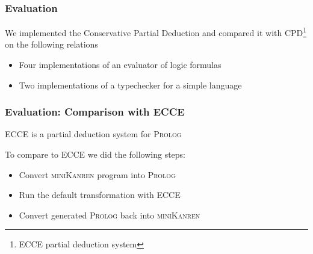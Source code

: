 \documentclass[xcolor=table]{beamer}
\newcommand{\mk}{\textsc{miniKanren}\xspace}
\newcommand{\pro}{\textsc{Prolog}\xspace}
\begin{document}
\begin{frame}[fragile]
  \frametitle{Evaluation}
We implemented the Conservative Partial Deduction and compared it with CPD\footnote{ECCE partial deduction system} on the following relations

\begin{itemize}
  \item Four implementations of an evaluator of logic formulas
  \item Two implementations of a typechecker for a simple language
\end{itemize}
\end{frame}

\begin{frame}[fragile]
  \frametitle{Evaluation: Comparison with ECCE}
\begin{center}
  ECCE is a partial deduction system for \pro
\end{center}

\vfill


To compare to ECCE we did the following steps:

\begin{itemize}
  \item Convert \mk program into \pro
  \item Run the default transformation with ECCE
  \item Convert generated \pro back into \mk
\end{itemize}
\end{frame}


%          
\end{document}
